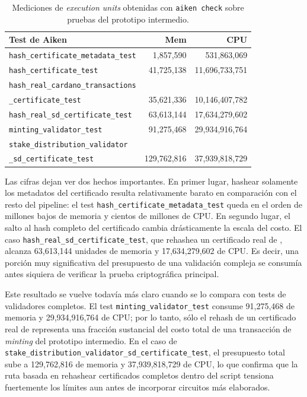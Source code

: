 \begin{table}[ht]
  \centering
  \small
  \begin{tabular}{p{6.0cm}r r}
    \toprule
    \textbf{Test de Aiken} & \textbf{Mem} & \textbf{CPU} \\
    \midrule
    \texttt{hash\_certificate\_metadata\_test} & 1,857,590 & 531,863,069 \\
    \texttt{hash\_certificate\_test} & 41,725,138 & 11,696,733,751 \\
    \texttt{hash\_real\_cardano\_transactions}\\\texttt{\_certificate\_test} & 35,621,336 & 10,146,407,782 \\
    \texttt{hash\_real\_sd\_certificate\_test} & 63,613,144 & 17,634,279,602 \\
    \texttt{minting\_validator\_test} & 91,275,468 & 29,934,916,764 \\
    \texttt{stake\_distribution\_validator}\\\texttt{\_sd\_certificate\_test} & 129,762,816 & 37,939,818,729 \\
    \bottomrule
  \end{tabular}
  \caption{Mediciones de \textit{execution units} obtenidas con \texttt{aiken check} sobre pruebas del prototipo intermedio.}
  \label{tab:chapter9-hash-benchmarks}
\end{table}

Las cifras dejan ver dos hechos importantes. En primer lugar, hashear solamente los metadatos del certificado resulta relativamente barato en comparación con el resto del pipeline: el test \texttt{hash\_certificate\_metadata\_test} queda en el orden de millones bajos de memoria y cientos de millones de CPU. En segundo lugar, el salto al hash completo del certificado cambia drásticamente la escala del costo. El caso \texttt{hash\_real\_sd\_certificate\_test}, que rehashea un certificado real de \StakeDistribution, alcanza 63,613,144 unidades de memoria y 17,634,279,602 de CPU. Es decir, una porción muy significativa del presupuesto de una validación compleja se consumía antes siquiera de verificar la prueba criptográfica principal.

Este resultado se vuelve todavía más claro cuando se lo compara con tests de validadores completos. El test \texttt{minting\_validator\_test} consume 91,275,468 de memoria y 29,934,916,764 de CPU; por lo tanto, sólo el rehash de un certificado real de \StakeDistribution representa una fracción sustancial del costo total de una transacción de \textit{minting} del prototipo intermedio. En el caso de \texttt{stake\_distribution\_validator\_sd\_certificate\_test}, el presupuesto total sube a 129,762,816 de memoria y 37,939,818,729 de CPU, lo que confirma que la ruta basada en rehashear certificados completos dentro del script tensiona fuertemente los límites \Onchain aun antes de incorporar circuitos más elaborados.

